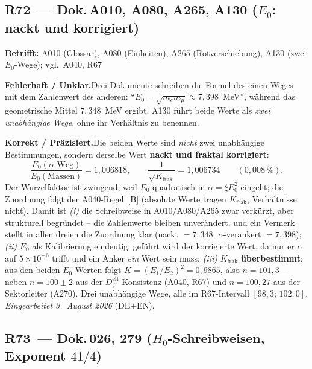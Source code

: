 \medskip

\subsection*{R72~--- Dok.\,A010, A080, A265, A130 ($E_0$: nackt
und korrigiert)}

\noindent\textbf{Betrifft:} A010 (Glossar), A080 (Einheiten), A265
(Rotverschiebung), A130 (zwei $E_0$-Wege); vgl.\ A040, R67

\smallskip\noindent\textbf{Fehlerhaft / Unklar.}\quad Drei Dokumente
schreiben die Formel des einen Weges mit dem Zahlenwert des anderen:
\enquote{$E_0 = \sqrt{m_em_\mu} \approx 7{,}398$~MeV}, während das
geometrische Mittel $7{,}348$~MeV ergibt. A130 führt beide Werte als
\emph{zwei unabhängige Wege}, ohne ihr Verhältnis zu benennen.

\smallskip\noindent\textbf{Korrekt / Präzisiert.}\quad Die beiden Werte
sind \emph{nicht} zwei unabhängige Bestimmungen, sondern derselbe Wert
\textbf{nackt und fraktal korrigiert}:
\[
  \frac{E_0(\alpha\text{-Weg})}{E_0(\text{Massen})}
  = 1{,}006818,
  \qquad
  \frac{1}{\sqrt{K_\text{frak}}} = 1{,}006734
  \qquad (0{,}008\,\%).
\]
Der Wurzelfaktor ist zwingend, weil $E_0$ quadratisch in
$\alpha = \xi E_0^2$ eingeht; die Zuordnung folgt der A040-Regel~[B]
(absolute Werte tragen $K_\text{frak}$, Verhältnisse nicht). Damit ist
\emph{(i)} die Schreibweise in A010/A080/A265 zwar verkürzt, aber
strukturell begründet -- die Zahlenwerte bleiben unverändert, und ein
Vermerk stellt in allen dreien die Zuordnung klar (nackt $= 7{,}348$;
$\alpha$-verankert $= 7{,}398$); \emph{(ii)} $E_0$ als Kalibrierung
eindeutig: geführt wird der korrigierte Wert, da nur er $\alpha$ auf
$5\times10^{-6}$ trifft und ein Anker \emph{ein} Wert sein muss;
\emph{(iii)} $K_\text{frak}$ \textbf{überbestimmt}: aus den beiden
$E_0$-Werten folgt $K = (E_1/E_2)^2 = 0{,}9865$, also $n = 101{,}3$ --
neben $n = 100\pm2$ aus der $D_f^\text{eff}$-Konsistenz (A040, R67) und
$n = 100{,}27$ aus der Sektorleiter (A270). Drei unabhängige Wege, alle
im R67-Intervall $[98{,}3;\,102{,}0]$. \emph{Eingearbeitet
3.~August 2026} (DE+EN).

\medskip

\subsection*{R73~--- Dok.\,026, 279 ($H_0$-Schreibweisen, Exponent
$41/4$)}

